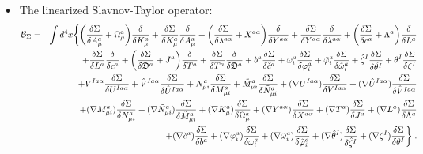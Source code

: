 \begin{appendix}
\begin{itemize}
\item{The linearized Slavnov-Taylor operator:}
\begin{eqnarray}
{\cal B}_{\Sigma} &=& \int d^{4}x \biggl\{
  \biggl(\frac{\delta \Sigma}{\delta A^{a}_{\mu}}
+ \Omega^{a}_{\mu} \biggr) \frac{\delta }{\delta K^{a}_{\mu}}
+ \frac{\delta \Sigma}{\delta K^{a}_{\mu}}\frac{\delta }{\delta A^{a}_{\mu}}
+ \biggl(\frac{\delta \Sigma}{\delta \lambda^{a\alpha}}
+ X^{a\alpha}\biggr)\frac{\delta }{\delta Y^{a\alpha}}
+ \frac{\delta \Sigma}{\delta Y^{a\alpha}}\frac{\delta }{\delta \lambda^{a\alpha}}
+\biggl(\frac{\delta \Sigma}{\delta c^{a}}
+ \Lambda^{a}\biggr)\frac{\delta }{\delta L^{a}} 
\nonumber \\
&&
+ \frac{\delta \Sigma}{\delta L^{a}}\frac{\delta }{\delta c^{a}}
+ \biggl(\frac{\delta \Sigma}{\delta \mathfrak{D}^{a}}
+ {J}^{a}\biggr)\frac{\delta }{\delta T^{a}}
+ \frac{\delta \Sigma}{\delta T^{a}}\frac{\delta }{\delta \mathfrak{D}^{a}}
+ b^{a}\frac{\delta \Sigma}{\delta \check{c}^{a}}
+ \omega^{a}_{i}\frac{\delta \Sigma}{\delta \varphi^{a}_{i}}
+ \tilde{\varphi}^{a}_{i}\frac{\delta \Sigma}{\delta \tilde{\omega}^{a}_{i}}
+ \hat{\zeta}^{I}\frac{\delta \Sigma}{\delta \hat{\theta}^{I}}
+ \theta^{I}\frac{\delta \Sigma}{\delta \zeta^{I}}
\nonumber \\
&&
+{V}^{Ia\alpha}\frac{\delta \Sigma}{\delta {U}^{Ia\alpha}}
+ \hat{V}^{Ia\alpha}\frac{\delta \Sigma}{\delta \hat{U}^{Ia\alpha}}
+ {N}^{a}_{\mu i}\frac{\delta \Sigma}{\delta{M}^{a}_{\mu i}}
+ \tilde{M}^{a}_{\mu i}\frac{\delta \Sigma}{\delta \tilde{N}^{a}_{\mu i}} 
+(\nabla{U}^{Ia\alpha})\frac{\delta \Sigma}{\delta{V}^{Ia\alpha}}
+(\nabla\hat{U}^{Ia\alpha})\frac{\delta \Sigma}{\delta \hat{V}^{Ia\alpha}}
\nonumber  \\
&&
+(\nabla{M}^{a}_{\mu i})\frac{\delta \Sigma}{\delta {N}^{a}_{\mu i}} 
+(\nabla\tilde{N}^{a}_{\mu i})\frac{\delta \Sigma}{\delta \tilde{M}^{a}_{\mu i}}
+(\nabla K^{a}_{\mu})\frac{\delta \Sigma}{\delta \Omega^{a}_{\mu}}
+(\nabla Y^{a\alpha})\frac{\delta \Sigma}{\delta {X}^{a\alpha}}
+(\nabla T^{a})\frac{\delta \Sigma}{\delta {J}^{a}}
+(\nabla L^{a})\frac{\delta \Sigma}{\delta {\Lambda}^{a}}\nonumber  \\
&&
+(\nabla \check{c}^{a})\frac{\delta \Sigma}{\delta b^{a}}
+(\nabla\varphi^{a}_{i})\frac{\delta \Sigma}{\delta \omega^{a}_{i}}
+(\nabla\tilde{\omega}^{a}_{i})\frac{\delta \Sigma}{\delta \tilde{\varphi}^{a}_{i}}
+(\nabla\hat{\theta}^{I})\frac{\delta \Sigma}{\delta \hat{\zeta}^{I}}
+(\nabla\zeta^{I})\frac{\delta \Sigma}{\delta \theta^{I}}  \biggr\} \;.
\label{ST2}
\end{eqnarray}



\end{itemize}
\end{appendix}
